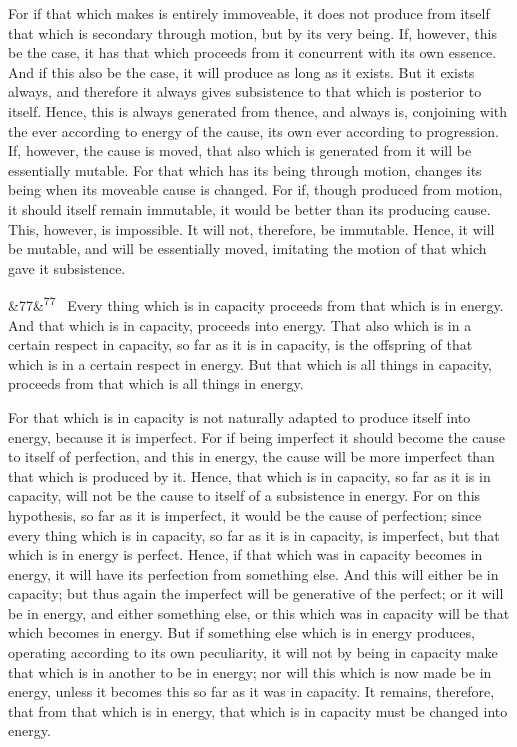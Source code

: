 \documentclass[12pt]{article}
\newcommand{\para}[1][]{\par\noindent\ifx&#1&\else\textsuperscript{\footnotesize #1}~\fi}
\begin{document}
For if that which makes is entirely immoveable, it does not produce from itself that which is secondary through motion, but by its very being. If, however, this be the case, it has that which proceeds from it concurrent with its own essence. And if this also be the case, it will produce as long as it exists. But it exists always, and therefore it always gives subsistence to that which is posterior to itself. Hence, this is always generated from thence, and always is, conjoining with the ever according to energy of the cause, its own ever according to progression. If, however, the cause is moved, that also which is generated from it will be essentially mutable. For that which has its being through motion, changes its being when its moveable cause is changed. For if, though produced from motion, it should itself remain immutable, it would be better than its producing cause. This, however, is impossible. It will not, therefore, be immutable. Hence, it will be mutable, and will be essentially moved, imitating the motion of that which gave it subsistence.

\para[77] Every thing which is in capacity proceeds from that which is in energy. And that which is in capacity, proceeds into energy. That also which is in a certain respect in capacity, so far as it is in capacity, is the offspring of that which is in a certain respect in energy. But that which is all things in capacity, proceeds from that which is all things in energy.

For that which is in capacity is not naturally adapted to produce itself into energy, because it is imperfect. For if being imperfect it should become the cause to itself of perfection, and this in energy, the cause will be more imperfect than that which is produced by it. Hence, that which is in capacity, so far as it is in capacity, will not be the cause to itself of a subsistence in energy. For on this hypothesis, so far as it is imperfect, it would be the cause of perfection; since every thing which is in capacity, so far as it is in capacity, is imperfect, but that which is in energy is perfect. Hence, if that which was in capacity becomes in energy, it will have its perfection from something else. And this will either be in capacity; but thus again the imperfect will be generative of the perfect; or it will be in energy, and either something else, or this which was in capacity will be that which becomes in energy. But if something else which is in energy produces, operating according to its own peculiarity, it will not by being in capacity make that which is in another to be in energy; nor will this which is now made be in energy, unless it becomes this so far as it was in capacity. It remains, therefore, that from that which is in energy, that which is in capacity must be changed into energy.
\end{document}
